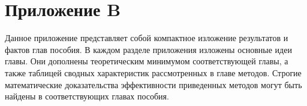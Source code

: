 \newpage
{}
\pagestyle{empty}
\chapter*{Приложение B}
\vspace{0.5cm}

Данное приложение представляет собой компактное изложение результатов и фактов глав пособия. В каждом разделе приложения изложены основные идеи главы. Они дополнены теоретическим минимумом соответствующей главы, а также таблицей сводных характеристик рассмотренных в главе методов. Строгие математические доказательства эффективности приведенных методов могут быть найдены в соответствующих главах пособия.






